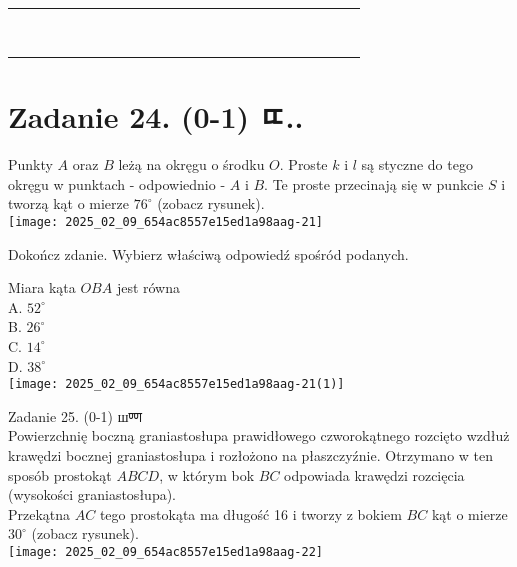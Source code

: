 \documentclass[10pt]{article}
\begin{document}
\begin{center}
\begin{tabular}{|c|c|c|c|c|c|c|c|c|c|c|c|c|c|c|c|c|c|c|c|c|c|}
\hline
 &  &  &  &  &  &  &  &  &  &  &  &  &  &  &  &  &  &  &  &  &  \\
\hline
 &  &  &  &  &  &  &  &  &  &  &  &  &  &  &  &  &  &  &  &  &  \\
\hline
 &  &  &  &  &  &  &  &  &  &  &  &  &  &  &  &  &  &  &  &  &  \\
\hline
 &  &  &  &  &  &  &  &  &  &  &  &  &  &  &  &  &  &  &  &  &  \\
\hline
 &  &  &  &  &  &  &  &  &  &  &  &  &  &  &  &  &  &  &  &  &  \\
\hline
 &  &  &  &  &  &  &  &  &  &  &  &  &  &  &  &  &  &  &  &  &  \\
\hline
 &  &  &  &  &  &  &  &  &  &  &  &  &  &  &  &  &  &  &  &  &  \\
\hline
 &  &  &  &  &  &  &  &  &  &  &  &  &  &  &  &  &  &  &  &  &  \\
\hline
 &  &  &  &  &  &  &  &  &  &  &  &  &  &  &  &  &  &  &  &  &  \\
\hline
\end{tabular}
\end{center}

\section*{Zadanie 24. (0-1) ㄸ..}
Punkty \(A\) oraz \(B\) leżą na okręgu o środku \(O\). Proste \(k\) i \(l\) są styczne do tego okręgu w punktach - odpowiednio - \(A\) i \(B\). Te proste przecinają się w punkcie \(S\) i tworzą kąt o mierze \(76^{\circ}\) (zobacz rysunek).\\
\texttt{[image: 2025\_02\_09\_654ac8557e15ed1a98aag-21]}

Dokończ zdanie. Wybierz właściwą odpowiedź spośród podanych.

Miara kąta \(O B A\) jest równa\\
A. \(52^{\circ}\)\\
B. \(26^{\circ}\)\\
C. \(14^{\circ}\)\\
D. \(38^{\circ}\)\\
\texttt{[image: 2025\_02\_09\_654ac8557e15ed1a98aag-21(1)]}

Zadanie 25. (0-1) шण्ण\\
Powierzchnię boczną graniastosłupa prawidłowego czworokątnego rozcięto wzdłuż krawędzi bocznej graniastosłupa i rozłożono na płaszczyźnie. Otrzymano w ten sposób prostokąt \(A B C D\), w którym bok \(B C\) odpowiada krawędzi rozcięcia (wysokości graniastosłupa).\\
Przekątna \(A C\) tego prostokąta ma długość 16 i tworzy z bokiem \(B C\) kąt o mierze \(30^{\circ}\) (zobacz rysunek).\\
\texttt{[image: 2025\_02\_09\_654ac8557e15ed1a98aag-22]}
\end{document}
